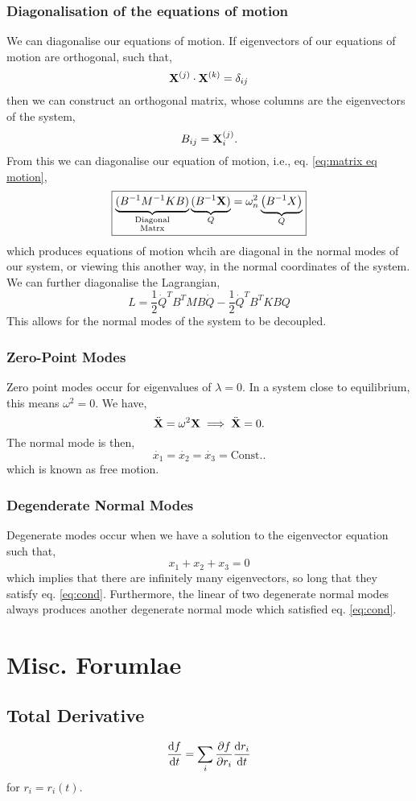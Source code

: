 \documentclass{book}
\begin{document}
\subsection{Diagonalisation of the equations of motion}
We can diagonalise our equations of motion. If eigenvectors of our equations of motion are orthogonal, such that,
\begin{equation}
	\vb{X}^{(j)}\cdot\vb{X}^{(k)} = \delta_{ij}
\end{equation}
then we can construct an orthogonal matrix, whose columns are the eigenvectors of the system,
\begin{equation}
	B_{ij} = \vb{X}_i^{(j)}.
\end{equation}
From this we can diagonalise our equation of motion, i.e., eq. \eqref{eq:matrix eq motion},
\begin{equation}
	\boxed{\underbrace{(B^{-1}M^{-1}KB)}_{\substack{\text{Diagonal}\\\text{Matrx}}}\underbrace{(B^{-1}\vb{X})}_{Q} = \omega_n^2 \underbrace{\left(B^{-1}X\right)}_{Q}}
\end{equation}
which produces equations of motion whcih are diagonal in the normal modes of our system, or viewing this another way, in the normal coordinates of the system. We can further diagonalise the Lagrangian,
\begin{equation}
	\boxed{L = \frac{1}{2}\Dot{Q}^TB^TMB\Dot{Q} - \frac{1}{2}\Dot{Q}^TB^TKBQ}
\end{equation}
This allows for the normal modes of the system to be decoupled.
\subsection{Zero-Point Modes}
Zero point modes occur for eigenvalues of $\lambda = 0$. In a system close to equilibrium, this means $\omega^2 = 0$. We have,
\begin{equation}
	\Ddot{\vb{X}} = \omega^2\vb{X} \implies \Ddot{\vb{X}} = 0.
\end{equation}
The normal mode is then,
\begin{equation}
	\Dot{x_1} = \Dot{x_2} = \Dot{x_3} = \text{Const.}.
\end{equation}
which is known as free motion.
\subsection{Degenderate Normal Modes}
Degenerate modes occur when we have a solution to the eigenvector equation such that,
\begin{equation}
	x_1 + x_2 + x_3 = 0 \label{eq:cond}
\end{equation}
which implies that there are infinitely many eigenvectors, so long that they satisfy eq. \eqref{eq:cond}. Furthermore, the linear of two degenerate normal modes always produces another degenerate normal mode which satisfied eq. \eqref{eq:cond}.
\appendix
\chapter{Misc. Forumlae}
\section{Total Derivative}
\begin{equation}
	\dv{f}{t} = \sum_i \pdv{f}{r_i}\dv{r_i}{t} \label{eq:totalderivative}
\end{equation}
for $r_i = r_i(t)$.
\end{document}
